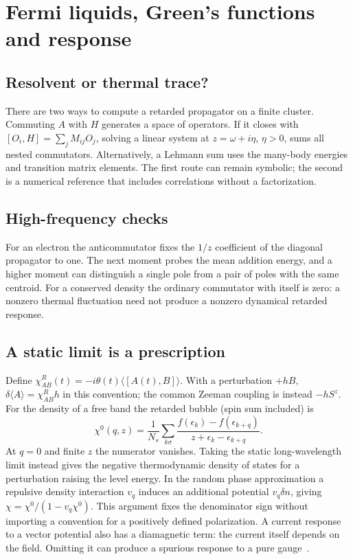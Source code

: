 \chapter{Fermi liquids, Green's functions and response}
\section{Resolvent or thermal trace?}
There are two ways to compute a retarded propagator on a finite
cluster. Commuting $A$ with $H$ generates a space of operators.
If it closes with $[O_i,H]=\sum_j M_{ij}O_j$, solving a linear
system at $z=\omega+i\eta$, $\eta>0$, sums all nested commutators.
Alternatively, a Lehmann sum uses the many-body energies and
transition matrix elements. The first route can remain symbolic;
the second is a numerical reference that includes correlations
without a factorization.
\section{High-frequency checks}
For an electron the anticommutator fixes the $1/z$ coefficient of
the diagonal propagator to one. The next moment probes the mean
addition energy, and a higher moment can distinguish a single pole
from a pair of poles with the same centroid. For a conserved density
the ordinary commutator with itself is zero: a nonzero thermal
fluctuation need not produce a nonzero dynamical retarded response.

\section{A static limit is a prescription}
Define $\chi^R_{AB}(t)=-i\theta(t)\langle[A(t),B]\rangle$.
With a perturbation $+h B$, $\delta\langle A\rangle=\chi^R_{AB} h$
in this convention; the common Zeeman coupling is instead $-h S^z$.
For the density of a free band the retarded bubble (spin sum included)
is
\[
 \chi^0(q,z)=\frac{1}{N_s}\sum_{k\sigma}
 \frac{f(\epsilon_k)-f(\epsilon_{k+q})}{z+\epsilon_k-\epsilon_{k+q}} .
\]
At $q=0$ and finite $z$ the numerator vanishes. Taking the static
long-wavelength limit instead gives the negative thermodynamic density
of states for a perturbation raising the level energy. In the random
phase approximation a repulsive density interaction $v_q$ induces an
additional potential $v_q\delta n$, giving
$\chi=\chi^0/(1-v_q\chi^0)$. This argument fixes the denominator sign
without importing a convention for a positively defined polarization.
A current response to a vector potential also has a diamagnetic term:
the current itself depends on the field. Omitting it can produce a
spurious response to a pure gauge~\cite{vucicevic}.
